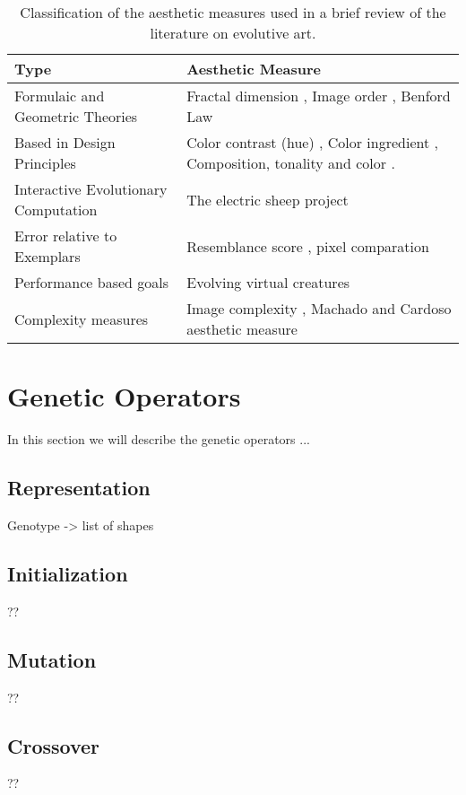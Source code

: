 \documentclass[conference]{IEEEtran}
\begin{document}
\begin{table*}[!t] 
\renewcommand{\arraystretch}{1.3} 
\caption{Classification of the aesthetic measures used in a brief review of the literature on evolutive art.} 
\label{table_class} 
\centering
\begin{tabular}{|l|l|}
\hline
Type & Aesthetic Measure \\ \hline
Formulaic and Geometric Theories & Fractal dimension \cite{den2010comparing}, Image order \cite{li2012investigating}, Benford Law \cite{del2005benford}\\ \hline
Based in Design Principles &  Color contrast (hue) \cite{den2012evolving},  Color ingredient \cite{li2012investigating}, Composition, tonality and color \cite{dipaola2009incorporating}.\\ \hline
Interactive Evolutionary Computation & The electric sheep project \cite{draves2006electric} \\ \hline
Error relative to Exemplars &  Resemblance score \cite{dipaola2009incorporating}, pixel comparation \cite{aguilar2008robotic}\\ \hline
Performance based goals & Evolving virtual creatures \cite{sims1994evolving} \\\hline
Complexity measures & Image complexity \cite{li2012investigating}, Machado and Cardoso aesthetic measure \cite{machado1998computing}\\ \hline
\end{tabular}
\end{table*}

\section{Genetic Operators}\label{go}
In this section we will describe the genetic operators ...
\subsection{Representation}\label{go:repre}
Genotype -> list of shapes
\subsection{Initialization}\label{go:init}
??
\subsection{Mutation}\label{go:mutation}
??
\subsection{Crossover}\label{go:crossover}
??
\end{document}

